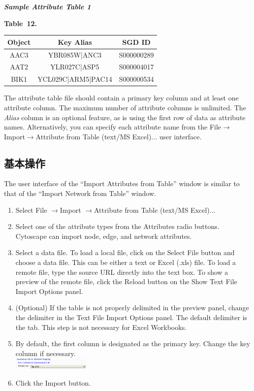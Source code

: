 \emph{\textbf{Sample Attribute Table 1} }

\textbf{Table 12. }

\begin{tabular}{|c|c|c|}
\hline 
 Object& Key Alias& SGD ID\\
\hline
 AAC3 &YBR085W|ANC3& S000000289\\
 AAT2 &YLR027C|ASP5& S000004017\\
 BIK1 &YCL029C|ARM5|PAC14 &S000000534\\
 \hline 
\end{tabular}

The attribute table file should contain a primary key column and at least one
attribute column. The maximum number of attribute columns is unlimited. The
\emph{Alias} column is an optional feature, as is using the first row of data
as attribute names. Alternatively, you can specify each attribute name from the
File$\rightarrow$Import$\rightarrow$Attribute from Table (text/MS Excel)...
user interface. 

\subsection{基本操作}
The user interface of the ``Import Attributes from Table'' window is similar
to that of the ``Import Network from Table'' window. 
\begin{enumerate}
\item Select File $\rightarrow$Import $\rightarrow$Attribute from Table (text/MS
Excel)... 
\item Select one of the attribute types from the Attributes radio buttons.
Cytoscape can import node, edge, and network attributes. 
\item Select a data file. To load a local file, click on the Select File button
and choose a data file. This can be either a text or Excel (.xls) file. To load
a remote file, type the source URL directly into the text box. To show a
preview of the remote file, click the Reload button on the Show Text File
Import Options panel. 
\item (Optional) If the table is not properly delimited in the preview panel,
change the delimiter in the Text File Import Options panel. The default
delimiter is the tab. This step is not necessary for Excel Workbooks. 
\item By default, the first column is designated as the primary key. Change the
key column if necessary.\\
\includegraphics[width=0.3\textwidth]{images/attribute_table_import_primary_key.png} 
\item Click the Import button. 
\end{enumerate}
 
